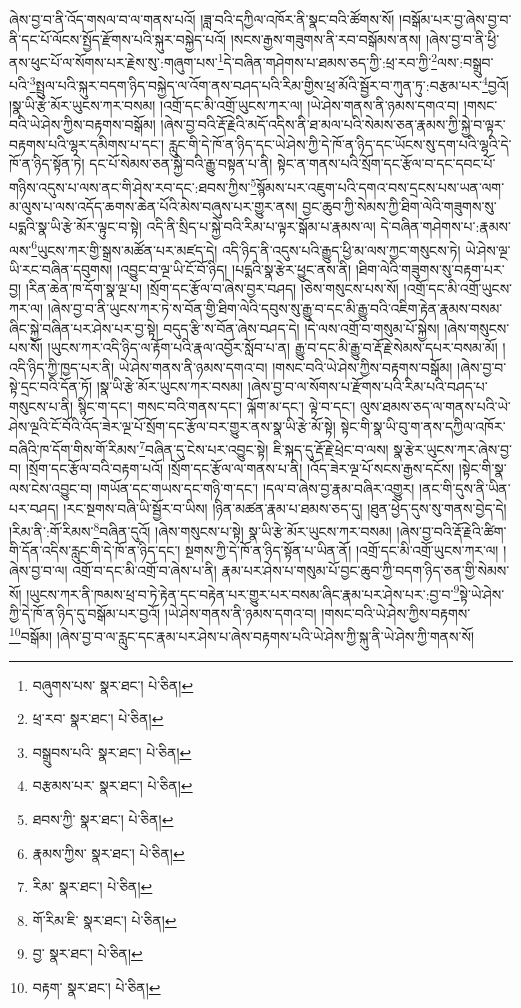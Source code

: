 ཞེས་བྱ་བ་ནི་འོད་གསལ་བ་ལ་གནས་པའོ། །ཟླ་བའི་དཀྱིལ་འཁོར་ནི་སྣང་བའི་ཚོགས་སོ། །བསྒོམ་པར་བྱ་ཞེས་བྱ་བ་ནི་དང་པོ་ལོངས་སྤྱོད་རྫོགས་པའི་སྐུར་བསྐྱེད་པའོ། །སངས་རྒྱས་གཟུགས་ནི་རབ་བསྒོམས་ནས། །ཞེས་བྱ་བ་ནི་ཕྱི་ནས་ཕུང་པོ་ལ་སོགས་པར་རྗེས་སུ་:གཞུག་པས་\footnote{བཞུགས་པས་  སྣར་ཐང་།  པེ་ཅིན། }དེ་བཞིན་གཤེགས་པ་ཐམས་ཅད་ཀྱི་:ཕྲ་རབ་ཀྱི་\footnote{ཕྲ་རབ་  སྣར་ཐང་།  པེ་ཅིན། }ལས་:བསྒྲུབ་པའི་\footnote{བསྒྲུབས་པའི་  སྣར་ཐང་།  པེ་ཅིན། }སྤྲུལ་པའི་སྐུར་བདག་ཉིད་བསྐྱེད་ལ་འོག་ནས་བཤད་པའི་རིམ་གྱིས་ཕྲ་མོའི་སྦྱོར་བ་ཀུན་ཏུ་:བརྩམ་པར་\footnote{བརྩམས་པར་  སྣར་ཐང་།  པེ་ཅིན། }བྱའོ། །སྣ་ཡི་རྩེ་མོར་ཡུངས་ཀར་བསམ། །འགྲོ་དང་མི་འགྲོ་ཡུངས་ཀར་ལ། །ཡེ་ཤེས་གནས་ནི་ཉམས་དགའ་བ། །གསང་བའི་ཡེ་ཤེས་ཀྱིས་བརྟགས་བསྒོམ། །ཞེས་བྱ་བའི་རྡོ་རྗེའི་མདོ་འདིས་ནི་ཐ་མལ་པའི་སེམས་ཅན་རྣམས་ཀྱི་སྐྱེ་བ་ལྟར་བརྟགས་པའི་ལྷར་དམིགས་པ་དང་། རླུང་གི་དེ་ཁོ་ན་ཉིད་དང་ཡེ་ཤེས་ཀྱི་དེ་ཁོ་ན་ཉིད་དང་ཡོངས་སུ་དག་པའི་ལྷའི་དེ་ཁོ་ན་ཉིད་སྟོན་ཏེ། དང་པོ་སེམས་ཅན་སྐྱེ་བའི་རྒྱུ་བསྟན་པ་ནི། སྟེང་ན་གནས་པའི་སྲོག་དང་རྩོལ་བ་དང་དབང་པོ་གཉིས་འདུས་པ་ལས་ནང་གི་ཤེས་རབ་དང་:ཐབས་ཀྱིས་\footnote{ཐབས་ཀྱི་  སྣར་ཐང་།  པེ་ཅིན། }སྙོམས་པར་འཇུག་པའི་དགའ་བས་དྲངས་པས་ཡན་ལག་མ་ལུས་པ་ལས་འདོད་ཆགས་ཆེན་པོའི་མེས་བཞུས་པར་གྱུར་ནས། བྱང་ཆུབ་ཀྱི་སེམས་ཀྱི་ཐིག་ལེའི་གཟུགས་སུ་པདྨའི་སྣ་ཡི་རྩེ་མོར་ལྟུང་བ་སྟེ། འདི་ནི་སྲིད་པ་སྐྱེ་བའི་རིམ་པ་ལྟར་སྒོམ་པ་རྣམས་ལ། དེ་བཞིན་གཤེགས་པ་:རྣམས་ལས་\footnote{རྣམས་ཀྱིས་  སྣར་ཐང་།  པེ་ཅིན། }ཡུངས་ཀར་གྱི་སྒྲས་མཚོན་པར་མཛད་དེ། འདི་ཉིད་ནི་འདུས་པའི་རྒྱུད་ཕྱི་མ་ལས་ཀྱང་གསུངས་ཏེ། ཡེ་ཤེས་ལྔ་ཡི་རང་བཞིན་དབུགས། །འབྱུང་བ་ལྔ་ཡི་ངོ་བོ་ཉིད། །པདྨའི་སྣ་རྩེར་ཕྱུང་ནས་ནི། །ཐིག་ལེའི་གཟུགས་སུ་བརྟག་པར་བྱ། །རིན་ཆེན་ཁ་དོག་སྣ་ལྔ་པ། །སྲོག་དང་རྩོལ་བ་ཞེས་བྱར་བཤད། །ཅེས་གསུངས་པས་སོ། །འགྲོ་དང་མི་འགྲོ་ཡུངས་ཀར་ལ། །ཞེས་བྱ་བ་ནི་ཡུངས་ཀར་ཏེ་ས་བོན་གྱི་ཐིག་ལེའི་དབུས་སུ་རྒྱུ་བ་དང་མི་རྒྱུ་བའི་འཇིག་རྟེན་རྣམས་བསམ་ཞིང་སྐྱེ་བཞིན་པར་ཤེས་པར་བྱ་སྟེ། བདུད་རྩི་ས་བོན་ཞེས་བཤད་དེ། །དེ་ལས་འགྲོ་བ་གསུམ་པོ་སྐྱེས། །ཞེས་གསུངས་པས་སོ། །ཡུངས་ཀར་འདི་ཉིད་ལ་རྟོག་པའི་རྣལ་འབྱོར་སློབ་པ་ན། རྒྱུ་བ་དང་མི་རྒྱུ་བ་རྡོ་རྗེ་སེམས་དཔར་བསམ་མོ། །འདི་ཉིད་ཀྱི་ཁྱད་པར་ནི། ཡེ་ཤེས་གནས་ནི་ཉམས་དགའ་བ། །གསང་བའི་ཡེ་ཤེས་ཀྱིས་བརྟགས་བསྒོམ། །ཞེས་བྱ་བ་སྟེ་དྲང་བའི་དོན་ཏོ། །སྣ་ཡི་རྩེ་མོར་ཡུངས་ཀར་བསམ། །ཞེས་བྱ་བ་ལ་སོགས་པ་རྫོགས་པའི་རིམ་པའི་བཤད་པ་གསུངས་པ་ནི། སྙིང་ག་དང་། གསང་བའི་གནས་དང་། ལྐོག་མ་དང་། ལྟེ་བ་དང་། ལུས་ཐམས་ཅད་ལ་གནས་པའི་ཡེ་ཤེས་ལྔའི་ངོ་བོའི་འོད་ཟེར་ལྔ་པོ་སྲོག་དང་རྩོལ་བར་གྱུར་ནས་སྣ་ཡི་རྩེ་མོ་སྟེ། སྟེང་གི་སྣ་ཡི་བུ་ག་ནས་དཀྱིལ་འཁོར་བཞིའི་ཁ་དོག་གིས་གོ་རིམས་\footnote{རིམ་  སྣར་ཐང་།  པེ་ཅིན། }བཞིན་དུ་ངེས་པར་འབྱུང་སྟེ། ཇི་སྐད་དུ་རྡོ་རྗེ་ཕྲེང་བ་ལས། སྣ་རྩེར་ཡུངས་ཀར་ཞེས་བྱ་བ། །སྲོག་དང་རྩོལ་བའི་བརྟག་པའོ། །སྲོག་དང་རྩོལ་ལ་གནས་པ་ནི། །འོད་ཟེར་ལྔ་པོ་སངས་རྒྱས་དངོས། །སྟེང་གི་སྣ་ལས་ངེས་འབྱུང་བ། །གཡོན་དང་གཡས་དང་གཉི་ག་དང་། །དལ་བ་ཞེས་བྱ་རྣམ་བཞིར་འགྱུར། །ནང་གི་དུས་ནི་ཡིན་པར་བཤད། །རང་སྔགས་བཞི་ཡི་སྦྱོར་བ་ཡིས། །ཉིན་མཚན་རྣམ་པ་ཐམས་ཅད་དུ། །ཐུན་ཕྱེད་དུས་སུ་གནས་བྱེད་དེ། །རིམ་ནི་:གོ་རིམས་\footnote{གོ་རིམ་ཇི་  སྣར་ཐང་།  པེ་ཅིན། }བཞིན་དུའོ། །ཞེས་གསུངས་པ་སྟེ། སྣ་ཡི་རྩེ་མོར་ཡུངས་ཀར་བསམ། །ཞེས་བྱ་བའི་རྡོ་རྗེའི་ཚིག་གི་དོན་འདིས་རླུང་གི་དེ་ཁོ་ན་ཉིད་དང་། སྔགས་ཀྱི་དེ་ཁོ་ན་ཉིད་སྟོན་པ་ཡིན་ནོ། །འགྲོ་དང་མི་འགྲོ་ཡུངས་ཀར་ལ། །ཞེས་བྱ་བ་ལ། འགྲོ་བ་དང་མི་འགྲོ་བ་ཞེས་པ་ནི། རྣམ་པར་ཤེས་པ་གསུམ་པོ་བྱང་ཆུབ་ཀྱི་བདག་ཉིད་ཅན་གྱི་སེམས་སོ། །ཡུངས་ཀར་ནི་ཁམས་ཕྲ་བ་ཏེ་རྟེན་དང་བརྟེན་པར་གྱུར་པར་བསམ་ཞིང་རྣམ་པར་ཤེས་པར་:བྱ་བ་\footnote{བྱ་  སྣར་ཐང་།  པེ་ཅིན། }སྟེ་ཡེ་ཤེས་ཀྱི་དེ་ཁོ་ན་ཉིད་དུ་བསྒོམ་པར་བྱའོ། །ཡེ་ཤེས་གནས་ནི་ཉམས་དགའ་བ། །གསང་བའི་ཡེ་ཤེས་ཀྱིས་བརྟགས་\footnote{བརྟག་  སྣར་ཐང་།  པེ་ཅིན། }བསྒོམ། །ཞེས་བྱ་བ་ལ་རླུང་དང་རྣམ་པར་ཤེས་པ་ཞེས་བརྟགས་པའི་ཡེ་ཤེས་ཀྱི་སྐུ་ནི་ཡེ་ཤེས་ཀྱི་གནས་སོ། 